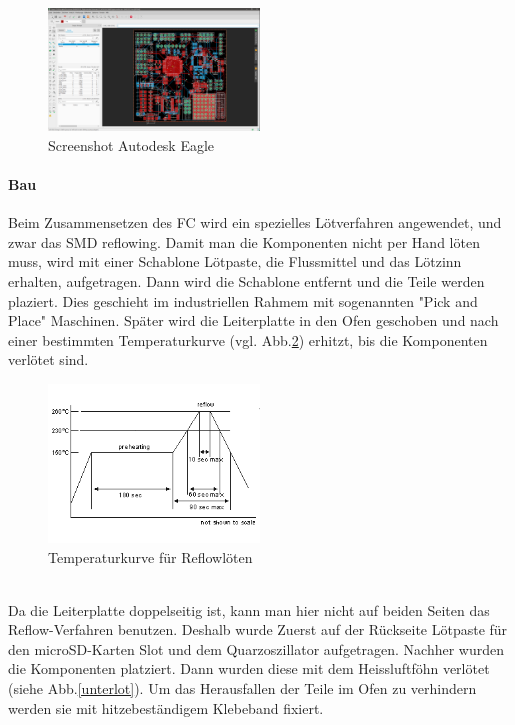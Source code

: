\documentclass[12pt,a4paper, ngerman]{article}
\begin{document}
\begin{figure}[h]
\centering
\includegraphics[width=0.5\textwidth]{egl.png}
\caption[]{Screenshot Autodesk Eagle} \label{eagle}
\end{figure}

\paragraph{Bau}
Beim Zusammensetzen des FC wird ein spezielles Lötverfahren angewendet, und zwar das SMD reflowing. Damit man die Komponenten nicht per Hand löten muss, wird mit einer Schablone Lötpaste, die Flussmittel und das Lötzinn erhalten, aufgetragen. Dann wird die Schablone entfernt und die Teile werden plaziert. Dies geschieht im industriellen Rahmem mit sogenannten "Pick and Place" Maschinen. Später wird die Leiterplatte in den Ofen geschoben und nach einer bestimmten Temperaturkurve (vgl. Abb.\ref{reflow}) erhitzt, bis die Komponenten verlötet sind\cite{website:sauter-elektronik.de_reflow}.
\begin{figure}[h]
\centering
\includegraphics[width=0.5\textwidth]{reflow.png}
\caption[\url{http://www.comtec-crystals.com/images/service/reflow.gif}]{Temperaturkurve für Reflowlöten}\label{reflow}
\end{figure} \\
Da die Leiterplatte doppelseitig ist, kann man hier nicht auf beiden Seiten das Reflow-Verfahren benutzen. Deshalb wurde Zuerst auf der Rückseite Lötpaste für den microSD-Karten Slot und dem Quarzoszillator aufgetragen. Nachher wurden die Komponenten platziert. Dann wurden diese mit dem Heissluftföhn verlötet (siehe Abb.\ref{unterlot}). Um das Herausfallen der Teile im Ofen zu verhindern werden sie mit hitzebeständigem Klebeband fixiert. \\
\end{document}
